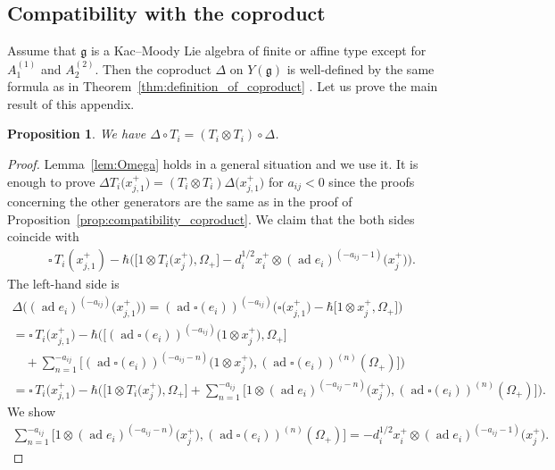 \documentclass[pdftex]{sigma}
\newtheorem{prop}[thm]{Proposition}
\theoremstyle{definition}
\numberwithin{equation}{section}
\DeclareMathOperator{\ad}{ad}
\newcommand{\frakg}{\mathfrak{g}}
\begin{document}
\subsection{Compatibility with the coproduct}

Assume that $\frakg$ is a Kac--Moody Lie algebra of finite or affine type except for $A_1^{(1)}$ and $A_2^{(2)}$. Then the coproduct $\Delta$ on $Y(\frakg)$ is well-defined by the same formula as in Theorem~\ref{thm:definition_of_coproduct} \cite[Definition~4.6, Theorem~4.9, Proposition~5.18]{MR3861718}. Let us prove the main result of this appendix.
\begin{prop}\label{prop:compatibility_coproduct2} We have $\Delta \circ T_i = (T_i \otimes T_i) \circ \Delta$.
\end{prop}
\begin{proof}Lemma~\ref{lem:Omega} holds in a general situation and we use it. It is enough to prove $\Delta T_i\big(x_{j,1}^+\big) = (T_i \otimes T_i)\Delta\big(x_{j,1}^+\big)$ for $a_{ij} < 0$ since the proofs concerning the other generators are the same as in the proof of Proposition~\ref{prop:compatibility_coproduct}. We claim that the both sides coincide with
\begin{gather*}
\square\,T_i(x_{j,1}^+)-\hbar \big( \big[1 \otimes T_i\big(x_j^+\big),\Omega_+\big] - d_i^{1/2}x_i^+ \otimes (\ad e_i)^{(-a_{ij}-1)}\big(x_j^+\big) \big).
\end{gather*}
The left-hand side is
\begin{gather*}
\Delta \big( (\ad e_i)^{(-a_{ij})} \big(x_{j,1}^+\big)\big) = (\ad \square(e_i))^{(-a_{ij})} \big(\square\big(x_{j,1}^+\big) - \hbar\big[1 \otimes x_j^+,\Omega_+\big]\big) \\
= \square\,T_i\big(x_{j,1}^+\big) - \hbar\bigg( \big[(\ad \square(e_i))^{(-a_{ij})}\big(1 \otimes x_j^+\big),\Omega_+\big] \\
\quad{} + \sum_{n=1}^{-a_{ij}} \big[(\ad \square(e_i))^{(-a_{ij}-n)}\big(1 \otimes x_j^+\big),(\ad \square(e_i))^{(n)}(\Omega_+)\big]\bigg) \\
= \square\,T_i\big(x_{j,1}^+\big) - \hbar\bigg( \big[1 \otimes T_i\big(x_j^+\big),\Omega_+\big] + \sum_{n=1}^{-a_{ij}} \big[1 \otimes (\ad e_i)^{(-a_{ij}-n)}\big(x_j^+\big),(\ad \square(e_i))^{(n)}(\Omega_+)\big]\bigg).
\end{gather*}
We show
\begin{gather*}
\sum_{n=1}^{-a_{ij}} \big[1 \otimes (\ad e_i)^{(-a_{ij}-n)}\big(x_j^+\big),(\ad \square(e_i))^{(n)}(\Omega_+)\big] = - d_i^{1/2} x_i^+ \otimes (\ad e_i)^{(-a_{ij}-1)}\big(x_j^+\big).

\end{gather*}
\end{proof}
\end{document}
